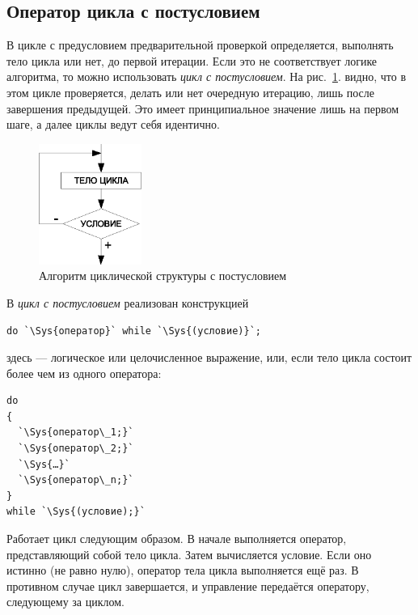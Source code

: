 \subsection[Оператор цикла с постусловием]{Оператор цикла с постусловием}
В цикле с предусловием предварительной проверкой определяется, выполнять тело цикла или нет, до первой итерации. Если
это не соответствует логике алгоритма, то можно использовать 
\emph{цикл с постусловием}. На рис.~\ref{ch03:refDrawing23}.
видно, что в этом цикле проверяется, делать или нет очередную итерацию, лишь после завершения предыдущей. Это имеет
принципиальное значение лишь на первом шаге, а далее циклы ведут себя идентично. 

\begin{figure}[htb]
\begin{center}
\includegraphics[width=0.3\textwidth]{img/ris_3_24}
\caption{Алгоритм циклической структуры с постусловием}
\label{ch03:refDrawing23}
\end{center}
\end{figure}

В  \emph{цикл с постусловием} реализован конструкцией
\begin{lstlisting}
do `\Sys{оператор}` while `\Sys{(условие)}`;
\end{lstlisting}
здесь  --- логическое или целочисленное выражение, или, если тело 
цикла состоит более чем из одного оператора:
\begin{lstlisting}
do
{
  `\Sys{оператор\_1;}`
  `\Sys{оператор\_2;}`
  `\Sys{…}`
  `\Sys{оператор\_n;}`
}
while `\Sys{(условие);}`
\end{lstlisting}

Работает цикл следующим образом. В начале выполняется оператор, представляющий собой тело цикла. Затем вычисляется
условие. Если оно истинно (не равно нулю), оператор тела цикла выполняется ещё раз. В противном случае цикл
завершается, и управление передаётся оператору, следующему за циклом.

